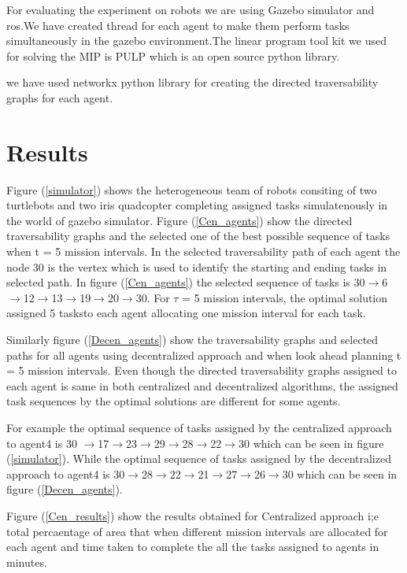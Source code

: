 \documentclass[conference]{IEEEtran}
\begin{document}
{For evaluating the experiment on robots we are using Gazebo simulator and ros.We have created thread for each agent to make  them perform tasks simultaneously in the gazebo environment.The linear program tool kit we used for solving the MIP is PULP which is an open source python library. 

we have used networkx python library for creating the directed traversability graphs for each agent.
\section{Results}

 Figure (\ref{simulator}) shows the heterogeneous team of robots consiting of two turtlebots and two iris quadcopter completing assigned tasks simulatenously in the world of gazebo simulator.
Figure (\ref{Cen_agents}) show the directed traversability graphs and the selected one of the best possible sequence of tasks when t = 5 mission intervals. In the selected traversability path of each agent the node 30 is the vertex which is used to identify the starting and ending tasks in selected path. In figure (\ref{Cen_agents}) the selected sequence of tasks is 30\(\rightarrow\)6\(\rightarrow\)12\(\rightarrow\)13\(\rightarrow\)19\(\rightarrow\)20\(\rightarrow\)30. For \(\tau\) = 5 mission intervals, the optimal solution assigned 5 tasksto each agent allocating one mission interval for each task.

Similarly figure (\ref{Decen_agents}) show the traversability graphs and selected paths for all agents using decentralized approach and when look ahead planning t = 5 mission intervals. Even though the directed traversability graphs assigned to each agent is same in both centralized and decentralized algorithms, the assigned task sequences by the optimal solutions are different for some agents.

For example the optimal sequence of tasks assigned by the centralized approach to agent4 is 30 \(\rightarrow\)17\(\rightarrow\)23\(\rightarrow\)29\(\rightarrow\)28\(\rightarrow\)22\(\rightarrow\)30 which can be seen in figure (\ref{simulator}). While the optimal sequence of tasks assigned by the decentralized approach to agent4 is 30\(\rightarrow\)28\(\rightarrow\)22\(\rightarrow\)21\(\rightarrow\)27\(\rightarrow\)26\(\rightarrow\)30 which can be seen in figure (\ref{Decen_agents}).

 Figure (\ref{Cen_results}) show the results obtained for Centralized approach i;e total percaentage of area that when different mission intervals are allocated for each agent and time taken to complete the all the tasks assigned to agents in minutes.

}
\end{document}
